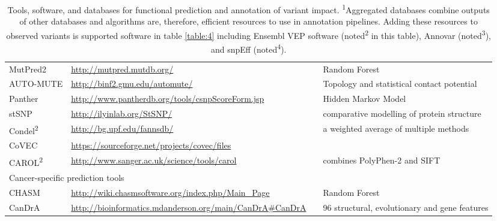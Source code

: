 \documentclass{article}
\begin{document}
\begin{table}[p]
\begin{tabularx}{1\textwidth}{p{2.5cm}Xp{3.5cm}p{3.5cm}}
  MutPred2 & \url{http://mutpred.mutdb.org/} & \parencite{Pejaver2017-lr} & Random Forest \\
  AUTO-MUTE & \url{http://binf2.gmu.edu/automute/} & \parencite{Masso2010-gf} & Topology and statistical contact potential\\ 
  Panther & \url{http://www.pantherdb.org/tools/csnpScoreForm.jsp} & \parencite{Thomas2003-rj} & Hidden Markov Model \\
  stSNP & \url{http://ilyinlab.org/StSNP/} & \parencite{Uzun2007-bk} &
  comparative modelling of protein structure \\
  Condel\textsuperscript{2} & \url{http://bg.upf.edu/fannsdb/} & \parencite{Gonzalez-Perez2011-gc} & a weighted average of multiple methods \\
  CoVEC & \url{https://sourceforge.net/projects/covec/files} &   &   \\
  CAROL\textsuperscript{2} & \url{http://www.sanger.ac.uk/science/tools/carol} &
  \parencite{Lopes2012-je} & combines PolyPhen-2 and SIFT \\
  \midrule
  \multicolumn{4}{l}{Cancer-specific prediction tools}    \\
  \midrule
  CHASM & \url{http://wiki.chasmsoftware.org/index.php/Main_Page} &
  \parencite{Carter2009-ci} & Random Forest \\
  CanDrA & \url{http://bioinformatics.mdanderson.org/main/CanDrA\#CanDrA} & \parencite{Mao2013-ie} & 96 structural, evolutionary and gene features  \\
   \bottomrule
\end{tabularx}
\caption{Tools, software, and databases for functional prediction and
  annotation of variant impact. \textsuperscript{1}Aggregated
  databases combine outputs of other databases and algorithms are,
  therefore, efficient resources to use in annotation
  pipelines. Adding these resources to observed variants is
  supported software in table \ref{table:4} including Ensembl VEP software (noted\textsuperscript{2} in
  this table), Annovar (noted\textsuperscript{3}), and snpEff
  (noted\textsuperscript{4}).
}
\label{table:2}
\end{table}
\end{document}
